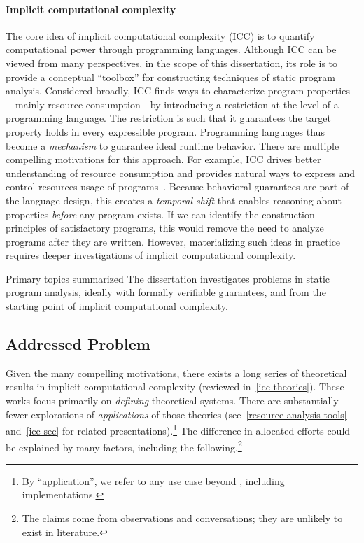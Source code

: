 \paragraph*{Implicit computational complexity}
The core idea of implicit computational complexity (ICC) is to quantify
computational power through programming languages. Although ICC can be viewed
from many perspectives, in the scope of this dissertation, its role is to
provide a conceptual \enquote{toolbox} for constructing techniques of static
program analysis. Considered broadly, ICC finds ways to characterize program
properties---mainly resource consumption---by introducing a restriction at the
level of a programming language. The restriction is such that it guarantees the
target property holds in every expressible program. Programming languages thus
become a \emph{mechanism} to guarantee ideal runtime behavior. There are
multiple compelling motivations for this approach. For example, ICC drives
better understanding of resource consumption and provides natural ways to
express and control resources usage of programs~\cite{kristiansen2017}. Because
behavioral guarantees are part of the language design, this creates a
\emph{temporal shift} that enables reasoning about properties \emph{before} any
program exists. If we can identify the construction principles of satisfactory
programs, this would remove the need to analyze programs after they are written.
However, materializing such ideas in practice requires deeper investigations of
implicit computational complexity.

\begin{infobox}[]{Primary topics summarized}
The dissertation investigates problems in {static program analysis}, ideally
with {formally verifiable guarantees}, and from the starting point of {implicit
computational complexity}.
\end{infobox}

\subsection{Addressed Problem}
\label{subsec:problem}

Given the many compelling motivations, there exists a long series of theoretical
results in implicit computational complexity (reviewed
in~\autoref{icc-theories}). These works focus primarily on \emph{defining}
theoretical systems. There are substantially fewer explorations of
\emph{applications} of those theories (see~\autoref{resource-analysis-tools}
and~\autoref{icc-sec} for related presentations).\footnote{By
\enquote{application}, we refer to any use case beyond ,
including implementations.} The difference in allocated efforts could be
explained by many factors, including the following.\footnote{The claims come
from observations and conversations; they are unlikely to exist in literature.}

